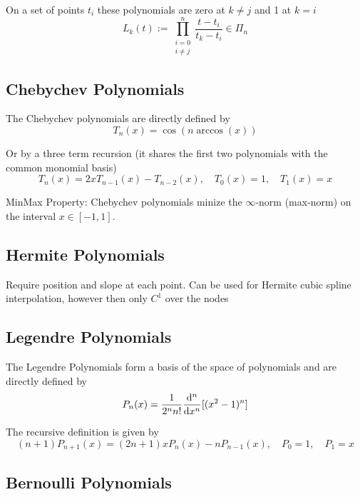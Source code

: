 \documentclass[
    a4paper,
    11pt
]{article}
\begin{document}
On a set of points $t_i$ these polynomials are zero at $k \neq j$ and 1 at $k =
i$
\begin{equation}
    L_k(t) := \prod_{\substack{i=0 \\ i\neq j}}^{n} \frac{t - t_i}{t_k - t_i}
    \in \Pi_n
\end{equation}

\subsection{Chebychev Polynomials}

The Chebychev polynomials are directly defined by
\begin{equation}
    T_n(x) = \cos(n\arccos(x))
\end{equation}

Or by a three term recursion (it shares the first two polynomials with the
common monomial basis)
\begin{equation}
    T_n(x) = 2xT_{n-1}(x) - T_{n-2}(x), \quad T_0(x) = 1, \quad T_1(x) = x
\end{equation}

MinMax Property: Chebychev polynomials minize the $\infty$-norm (max-norm) on
the interval $x \in [-1, 1]$.

\subsection{Hermite Polynomials}

Require position and slope at each point. Can be used for Hermite cubic spline
interpolation, however then only $C^1$ over the nodes

\subsection{Legendre Polynomials}

The Legendre Polynomials form a basis of the space of polynomials and are
directly defined by
\begin{equation}
    P_n(x) = \frac{1}{2^n n!} \dv[n]{}{x}[(x^2 - 1)^n]
\end{equation}

The recursive definition is given by
\begin{equation}
    (n+1)P_{n+1}(x) = (2n+1)xP_n(x) - n P_{n-1}(x), \quad P_0 = 1, \quad P_1=x
\end{equation}

\subsection{Bernoulli Polynomials}
\end{document}
